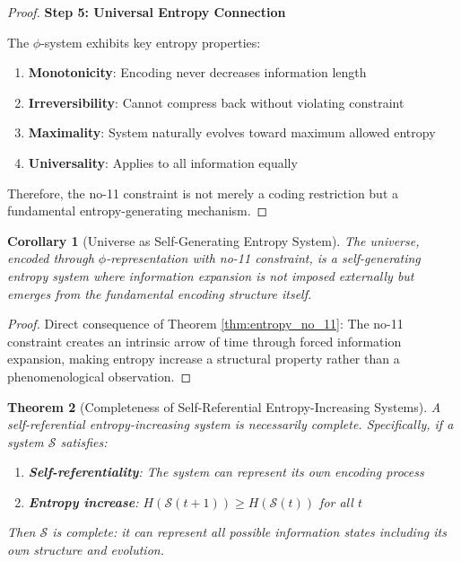 \documentclass[12pt,letterpaper]{article}
\newtheorem{theorem}{Theorem}[section]
\newtheorem{corollary}[theorem]{Corollary}
\begin{document}
\begin{proof}
\textbf{Step 5: Universal Entropy Connection}

The $\phi$-system exhibits key entropy properties:
\begin{enumerate}
\item \textbf{Monotonicity}: Encoding never decreases information length
\item \textbf{Irreversibility}: Cannot compress back without violating constraint
\item \textbf{Maximality}: System naturally evolves toward maximum allowed entropy
\item \textbf{Universality}: Applies to all information equally
\end{enumerate}

Therefore, the no-11 constraint is not merely a coding restriction but a fundamental entropy-generating mechanism.
\end{proof}

\begin{corollary}[Universe as Self-Generating Entropy System]
The universe, encoded through $\phi$-representation with no-11 constraint, is a self-generating entropy system where information expansion is not imposed externally but emerges from the fundamental encoding structure itself.
\end{corollary}

\begin{proof}
Direct consequence of Theorem \ref{thm:entropy_no_11}: The no-11 constraint creates an intrinsic arrow of time through forced information expansion, making entropy increase a structural property rather than a phenomenological observation.
\end{proof}

\begin{theorem}[Completeness of Self-Referential Entropy-Increasing Systems]
\label{thm:self_ref_complete}
A self-referential entropy-increasing system is necessarily complete. Specifically, if a system $\mathcal{S}$ satisfies:
\begin{enumerate}
\item \textbf{Self-referentiality}: The system can represent its own encoding process 
\item \textbf{Entropy increase}: $H(\mathcal{S}(t+1)) \geq H(\mathcal{S}(t))$ for all $t$
\end{enumerate}
Then $\mathcal{S}$ is complete: it can represent all possible information states including its own structure and evolution.
\end{theorem}
\end{document}

